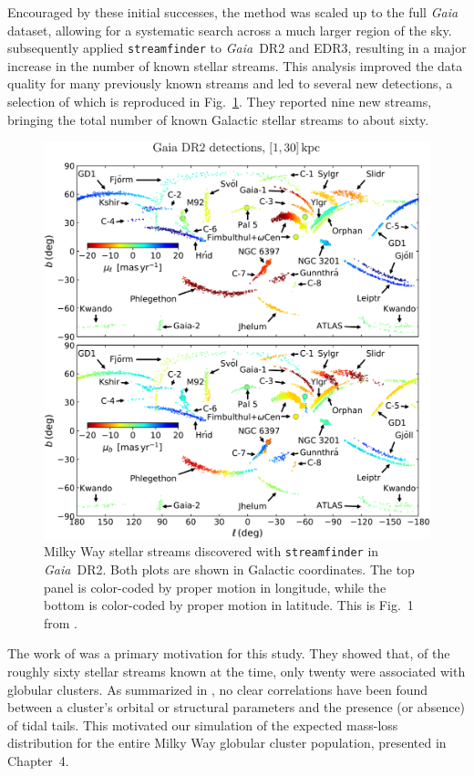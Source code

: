     Encouraged by these initial successes, the method was scaled up to the full \emph{Gaia} dataset, allowing for a systematic search across a much larger region of the sky. \citet{2021ApJ...914..123I} subsequently applied \texttt{streamfinder} to \emph{Gaia}~DR2 and EDR3, resulting in a major increase in the number of known stellar streams. This analysis improved the data quality for many previously known streams and led to several new detections, a selection of which is reproduced in Fig.~\ref{fig:ibata_2021_fig1}. They reported nine new streams, bringing the total number of known Galactic stellar streams to about sixty. 
    \begin{figure}
        \centering
        \includegraphics[width=\linewidth]{images/ibata_2021_fig1.jpg}
        \caption[Milky Way stellar streams discovered with \texttt{streamfinder} in \emph{Gaia} DR2]{Milky Way stellar streams discovered with \texttt{streamfinder} in \emph{Gaia}~DR2. Both plots are shown in Galactic coordinates. The top panel is color-coded by proper motion in longitude, while the bottom is color-coded by proper motion in latitude. This is Fig.~1 from \citet{2021ApJ...914..123I}.}
        \label{fig:ibata_2021_fig1}
    \end{figure}
    The work of \citet{2021ApJ...914..123I} was a primary motivation for this study. They showed that, of the roughly sixty stellar streams known at the time, only twenty were associated with globular clusters.  As summarized in \citet{2020A&A...637L...2P}, no clear correlations have been found between a cluster's orbital or structural parameters and the presence (or absence) of tidal tails. This motivated our simulation of the expected mass-loss distribution for the entire Milky Way globular cluster population, presented in Chapter~4.


